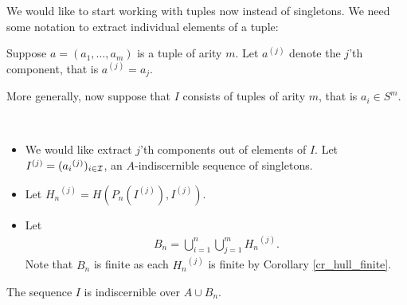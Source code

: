 \newcommand{\tpl}[2]{{#1}^{(#2)}}

We would like to start working with tuples now instead of singletons.
We need some notation to extract individual elements of a tuple:
\begin{Definition}
  Suppose $a = (a_1, \ldots, a_m)$ is a tuple of arity $m$.
  Let $\tpl{a}{j}$ denote the $j$'th component, that is $\tpl{a}{j} = a_j$.
\end{Definition}

More generally, now suppose that $I$ consists of tuples of arity $m$, that is $a_i \in S^m$.

\begin{Definition} \ 
  \begin{itemize}
  \item We would like extract $j$'th components out of elements of $I$.
    Let $\tpl{I}{j} = (\tpl{a_i}{j})_{i \in \I}$, an $A$-indiscernible sequence of singletons.
  \item Let $\tpl{H_n}{j} = H(P_n(\tpl{I}{j}), \tpl{I}{j})$.
  \item Let
    \begin{align*}
      B_n = \bigcup_{i = 1}^{n} \bigcup_{j = 1}^{m} \tpl{H_n}{j}.
    \end{align*}
    Note that $B_n$ is finite as each $\tpl{H_n}{j}$ is finite by Corollary \ref{cr_hull_finite}.
  \end{itemize}
\end{Definition}

\begin{Lemma} \label{cr_bump}
  The sequence $I$ is indiscernible over $A \cup B_n$.
\end{Lemma}

